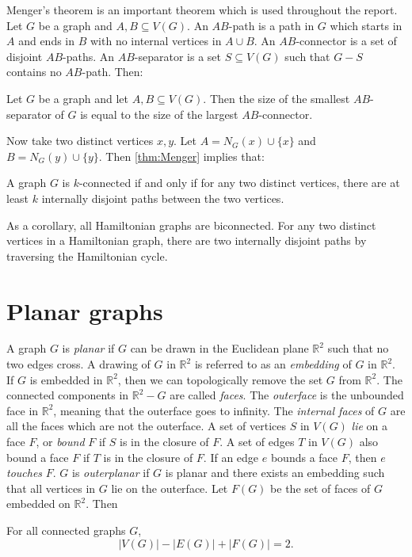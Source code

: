 Menger's theorem \cite{mengerZurAllgemeinenKurventheorie1927} is an important theorem which is used throughout the report.
Let \(G\) be a graph and \(A, B \subseteq V(G)\). An \(AB\)-path is a path in \(G\) which starts in \(A\) and ends in \(B\) with no internal vertices in \(A \cup B\). An \(AB\)-connector is a set of disjoint \(AB\)-paths. An \(AB\)-separator is a set \(S \subseteq V(G)\) such that \(G - S\) contains no \(AB\)-path. Then:
\begin{theorem}\label{thm:Menger}
	Let $G$ be a graph and let $A, B \subseteq V(G)$. Then the size of the smallest \(AB\)-separator of \(G\) is equal to the size of the largest \(AB\)-connector.
\end{theorem}
Now take two distinct vertices \(x, y\). Let \(A = N_G(x) \cup \{x\} \) and \(B = N_G(y) \cup \{y\} \). Then \cref{thm:Menger} implies that:
\begin{theorem}\label{thm:Menger_Vertex}
	A graph \(G\) is \(k\)-connected if and only if for any two distinct vertices, there are at least \(k\) internally disjoint paths between the two vertices.
\end{theorem}
As a corollary, all Hamiltonian graphs are biconnected. For any two distinct vertices in a Hamiltonian graph, there are two internally disjoint paths by traversing the Hamiltonian cycle.

\section{Planar graphs}\label{sec:Planar graphs}
A graph \(G\) is \textit{planar} if \(G\) can be drawn in the Euclidean plane \( \mathbb{R}^2 \) such that no two edges cross. A drawing of $G$ in $\mathbb{R}^2$ is referred to as an \textit{embedding} of $G$ in $\mathbb{R}^2$. If \(G\) is embedded in \(\mathbb{R}^2 \), then we can topologically remove the set $G$ from $\mathbb{R}^2$. The connected components in $\mathbb{R}^2 - G$ are called \textit{faces}. The \textit{outerface} is the unbounded face in $\mathbb{R}^2$, meaning that the outerface goes to infinity. The \textit{internal faces} of $G$ are all the faces which are not the outerface. A set of vertices $S$ in $V(G)$ \textit{lie} on a face $F$, or \textit{bound} $F$ if $S$ is in the closure of $F$. A set of edges $T$ in $V(G)$ also bound a face $F$ if $T$ is in the closure of $F$. If an edge $e$ bounds a face $F$, then $e$ \textit{touches} $F$. \(G\) is \textit{outerplanar} if \(G\) is planar and there exists an embedding such that all vertices in \(G\) lie on the outerface.
Let \(F(G)\) be the set of faces of \(G\) embedded on \(\mathbb{R}^2\). Then
\begin{theorem}\label{thm:Euler_planar}
	For all connected graphs $G$,
	\begin{equation}
		|V(G)| - |E(G)| + |F(G)| = 2.
	\end{equation}
\end{theorem}

